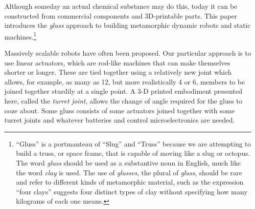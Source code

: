 \documentclass[11pt]{article}
\begin{document}
Although someday an actual chemical substance may do this, today it can be constructed from commercial components
and 3D-printable parts. This paper introduces the \emph{gluss} approach to building metamorphic dynamic robots
and static machines.\footnote{ ``Gluss'' is a portmanteau of ``Slug'' and ``Truss'' because we are attempting to
build a truss, or space frame, that is capable of moving like a slug or octopus.
The word \textit{gluss}
should be used as a substantive noun in English, much like the word \textit{clay} is used.
The use of \textit{glusses}, the plural
of \textit{gluss}, should be rare and refer to different kinds of metamorphic material, such as the expression
``four clays'' suggests four distinct types of clay without specifying how many kilograms of each one means.}

Massively scalable robots have often been proposed. Our particular approach is to use linear actuators,
which are rod-like machines that can make themselves shorter or longer. These are tied together using
a relatively new joint \cite{song2003spherical} which allows, for example, as many as 12, but more realistically 4 or 6,
members to be joined together sturdily at a single point.
A 3-D printed embodiment presented here, called the \emph{turret joint}, allows the
change of angle required for the gluss to ooze about. Some gluss consists of some actuators joined together
with some turret joints and whatever batteries and control microelectronics are needed.
\end{document}

